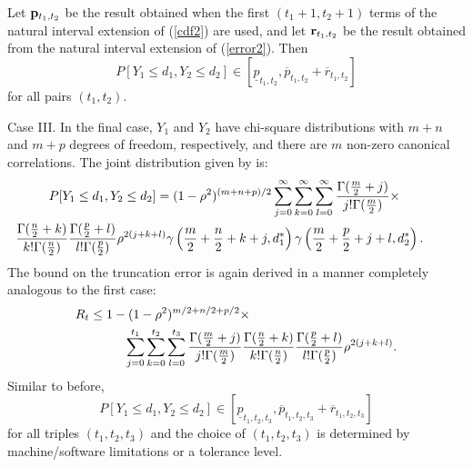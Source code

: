 Let ${\bf p}_{t_1,t_2}$ be the result obtained when the first 
$(t_1+1, t_2+1)$ terms of the
natural interval extension of (\ref{cdf2}) are used, and let ${\bf r}_{t_1,t_2}$ 
be the
result obtained from the natural interval extension of (\ref{error2}).  Then 
$$P[Y_1 \leq d_1, Y_2 \leq d_2] \in
 [ \underline{p}_{t_1,t_2} , 
   \overline{ p}_{t_1,t_2} + \overline{ r}_{t_1,t_2}]$$ 
for all pairs $(t_1,t_2)$.



Case III. In the final case, 
$Y_1$ and $Y_2$ have chi-square distributions with 
$m+n$ and $m+p$ degrees of freedom, respectively, and
there are $m$ non-zero canonical correlations.
The joint distribution given by \cite{Gunst} is:
\begin{eqnarray}
\lefteqn{P[Y_1 \leq d_1, Y_2 \leq d_2 ]= (1-\rho^2)^{(m+n+p)/2} 
 \sum_{j=0}^\infty \sum_{k=0}^\infty  \sum_{l=0}^\infty 
 \frac{ \Gamma (\frac{m}{2}+j)}{ j! \Gamma (\frac{m}{2})  }
 \times}  \nonumber \\
  & & \hspace{-.5in}
 \frac{ \Gamma (\frac{n}{2}+k)}{ k! \Gamma (\frac{n}{2})  }
 \frac{ \Gamma (\frac{p}{2}+l)}{ l! \Gamma (\frac{p}{2})  } 
 \rho^{2(j+k+l)} \gamma \left(\frac{m}{2}+\frac{n}{2}+k+j, d_1^* \right)  
 \gamma \left(\frac{m}{2}+\frac{p}{2}+j+l, d_2^* \right).  \label{cdf3} 
\end{eqnarray}
The bound on the truncation error is again derived in a manner completely 
analogous to the first case:
\begin{eqnarray}
\label{error3}
\lefteqn{ R_t \leq 1- (1-\rho^2)^{m/2 + n/2 + p/2}
   \times} \nonumber \hspace{3.5in}\\
   \sum_{j=0}^{t_1} \sum_{k=0}^{t_2} 
   \sum_{l=0}^{t_3} 
   \frac{\Gamma (\frac{m}{2}+j)}{ j! \Gamma (\frac{m}{2}) }
   \frac{\Gamma (\frac{n}{2}+k)}{ k! \Gamma (\frac{n}{2}) }
   \frac{\Gamma (\frac{p}{2}+l)}{ l! \Gamma (\frac{p}{2}) }
   \rho^{2(j +k +l)}. 
\end{eqnarray}
Similar to before, 
$$P[Y_1 \leq d_1, Y_2 \leq d_2] \in
 [ \underline{ p}_{t_1,t_2,t_3} , 
   \overline{ p}_{t_1,t_2, t_3} + \overline{ r}_{t_1,t_2, t_3}]$$ 
for all triples $(t_1,t_2, t_3)$ and the choice of $(t_1,t_2, t_3)$ is 
determined by machine/software limitations or a tolerance level.

